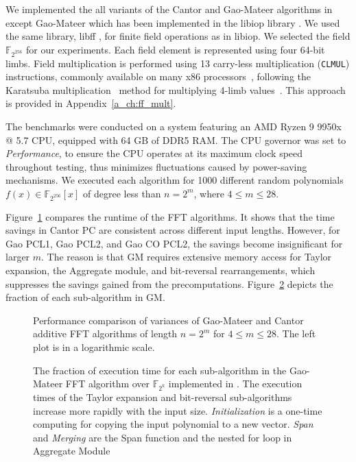 We implemented the all variants of the Cantor and Gao-Mateer algorithms in \CC except Gao-Mateer which has been implemented in the libiop library \cite{libiop}. We used the same library, libff \cite{libff}, for finite field operations as in libiop. We selected the field $\mathbb{F}_{2^{256}}$ for our experiments. Each field element is represented using four 64-bit limbs. Field multiplication is performed using 13 carry-less multiplication (\texttt{CLMUL}) instructions, commonly available on many x86 processors~\cite{gueron2010intel}, following the Karatsuba multiplication~\cite{karatsuba1962multiplication} method for multiplying 4-limb values~\cite{libiop}. This approach is provided in Appendix~\ref{a_ch:ff_mult}.

The benchmarks were conducted on a system featuring an AMD Ryzen 9 9950x @ 5.7 CPU, equipped with 64 GB of DDR5 RAM. The CPU governor was set to \textit{Performance}, to ensure the CPU operates at its maximum clock speed throughout testing, thus minimizes fluctuations caused by power-saving mechanisms.
We executed each algorithm for 1000 different random polynomials \( f(x) \in \mathbb{F}_{2^{256}}[x] \) of degree less than \( n = 2^m \), where \( 4 \leq m \leq 28 \).

Figure~\ref{fig:benchmark} compares the runtime of the FFT algorithms. It shows that the time savings in Cantor PC are consistent across different input lengths. However, for Gao PCL1, Gao PCL2, and Gao CO PCL2, the savings become insignificant for larger $m$. The reason is that GM requires extensive memory access for Taylor expansion, the \textsf{Aggregate} module, and bit-reversal rearrangements, which suppresses the savings gained from the precomputations.  Figure~\ref{fig:sub_parts_normalized} depicts the fraction of each sub-algorithm in GM.

\begin{figure}
	\centering
	\resizebox{\textwidth}{!}{
		
	}
	\caption[Performance comparison of variances of Gao-Mateer and Cantor FFT algorithms]{Performance comparison of variances of Gao-Mateer and Cantor additive FFT algorithms of length $n=2^m$ for $4\leq m \leq 28$. The left plot is in a logarithmic scale. }
	\label{fig:benchmark}
\end{figure}

\begin{figure}[ht!]
	\centering
	\resizebox{.9\textwidth}{!}{
		
	}
	\caption[The fraction of execution time for each sub-algorithm in the Gao-Mateer FFT algorithm]{The fraction of execution time for each sub-algorithm in the Gao-Mateer FFT algorithm over $\mathbb{F}_{2^k}$ implemented in \cite{libiop}. The execution times of the Taylor expansion and bit-reversal sub-algorithms increase more rapidly with the input size.  \textit{Initialization} is a one-time computing for copying the input polynomial to a new vector. \textit{Span} and \textit{Merging} are the \textsf{Span} function and the nested for loop in \textsf{Aggregate} Module}
	\label{fig:sub_parts_normalized}
\end{figure}

